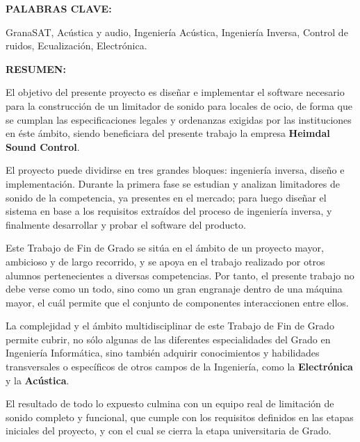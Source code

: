 \vspace{0.75cm}


\begin{doublespace}
    \noindent \textbf{PALABRAS CLAVE:}
\end{doublespace}


\begin{singlespace}
    \noindent GranaSAT, Acústica y audio, Ingeniería Acústica, Ingeniería Inversa, Control de ruidos, Ecualización, Electrónica.
\end{singlespace}

\begin{doublespace}
    \noindent \textbf{RESUMEN:}
\end{doublespace}

\begin{singlespace}
    \noindent El objetivo del presente proyecto es diseñar e implementar el software necesario para la construcción de un limitador de sonido para locales de ocio, de forma que se cumplan las especificaciones legales y ordenanzas exigidas por las instituciones en éste ámbito, siendo beneficiara del presente trabajo la empresa \textbf{Heimdal Sound Control}.

    \noindent El proyecto puede dividirse en tres grandes bloques: ingeniería inversa, diseño e implementación. Durante la primera fase se estudian y analizan limitadores de sonido de la competencia, ya presentes en el mercado; para luego diseñar el sistema en base a los requisitos extraídos del proceso de ingeniería inversa, y finalmente desarrollar y probar el software del producto.

    \noindent Este Trabajo de Fin de Grado se sitúa en el ámbito de un proyecto mayor, ambicioso y de largo recorrido, y se apoya en el trabajo realizado por otros alumnos pertenecientes a diversas competencias. Por tanto, el presente trabajo no debe verse como un todo, sino como un gran engranaje dentro de una máquina mayor, el cuál permite que el conjunto de componentes interaccionen entre ellos.

    \noindent La complejidad y el ámbito multidisciplinar de este Trabajo de Fin de Grado permite cubrir, no sólo algunas de las diferentes especialidades del Grado en Ingeniería Informática, sino también adquirir conocimientos y habilidades transversales o específicos de otros campos de la Ingeniería, como la \textbf{Electrónica} y la \textbf{Acústica}.

    \noindent El resultado de todo lo expuesto culmina con un equipo real de limitación de sonido completo y funcional, que cumple con los requisitos definidos en las etapas iniciales del proyecto, y con el cual se cierra la etapa universitaria de Grado.
\end{singlespace}

